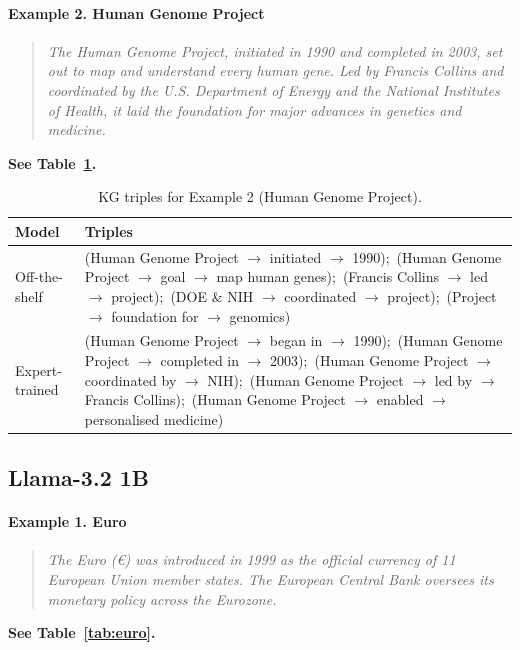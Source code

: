 \documentclass[11pt]{article}
\begin{document}
{\paragraph{Example 2. Human Genome Project}
\begin{quote}\small
\textit{The Human Genome Project, initiated in 1990 and completed in 2003, set out to
map and understand every human gene. Led by Francis Collins and coordinated by the U.S.
Department of Energy and the National Institutes of Health, it laid the foundation for
major advances in genetics and medicine.}
\end{quote}
\noindent\textbf{See Table~\ref{tab:hgp}.}
\begin{table}[h]
\centering\small
\caption{KG triples for Example 2 (Human Genome Project).}\label{tab:hgp}
\begin{tabular}{@{}p{}p{}@{}}
\textbf{Model} & \textbf{Triples}\\\hline
Off-the-shelf &
\ttfamily(Human Genome Project $\to$ initiated $\to$ 1990);\,
(Human Genome Project $\to$ goal $\to$ map human genes);\,
(Francis Collins $\to$ led $\to$ project);\,
(DOE \& NIH $\to$ coordinated $\to$ project);\,
(Project $\to$ foundation for $\to$ genomics)
\\
Expert-trained &
\ttfamily(Human Genome Project $\to$ began in $\to$ 1990);\,
(Human Genome Project $\to$ completed in $\to$ 2003);\,
(Human Genome Project $\to$ coordinated by $\to$ NIH);\,
(Human Genome Project $\to$ led by $\to$ Francis Collins);\,
(Human Genome Project $\to$ enabled $\to$ personalised medicine)
\end{tabular}
\end{table}

\subsection{Llama-3.2 1B}

\paragraph{Example 1. Euro}
\begin{quote}\small
\textit{The Euro (€) was introduced in 1999 as the official currency of 11 European Union
member states. The European Central Bank oversees its monetary policy across the Eurozone.}
\end{quote}
\noindent\textbf{See Table~\ref{tab:euro}.}

}
\end{document}
